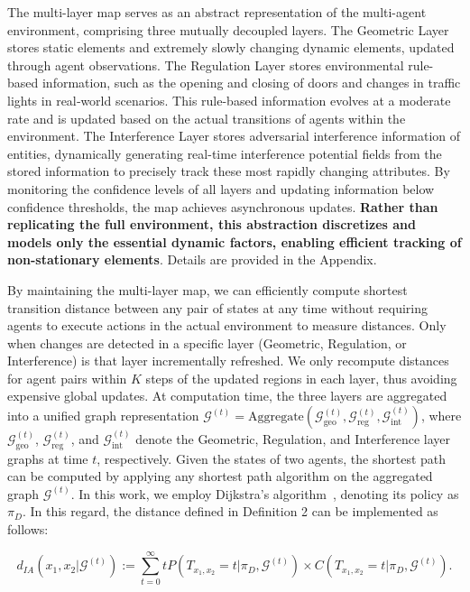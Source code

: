 \documentclass[10pt]{article} %
\newcommand{\rev}[1]{#1}
\begin{document}
The multi-layer map serves as an abstract representation of the multi-agent environment, comprising three mutually decoupled layers. The Geometric Layer stores static elements and extremely slowly changing dynamic elements, updated through agent observations. The Regulation Layer stores environmental rule-based information, such as the opening and closing of doors and changes in traffic lights in real‑world scenarios. This rule-based information evolves at a moderate rate and is updated \rev{based on the actual transitions of agents within the environment}. The Interference Layer stores adversarial interference information of entities, dynamically generating real-time interference potential fields from the stored information to precisely track these most rapidly changing attributes. By monitoring the confidence levels of all layers and updating information below confidence thresholds, the map achieves asynchronous updates. \textbf{Rather than replicating the full environment, this abstraction discretizes and models only the essential dynamic factors, enabling efficient tracking of non-stationary elements}. Details are provided in the Appendix.

By maintaining the multi-layer map, we can efficiently compute shortest transition distance between any pair of states at any time without requiring agents to execute actions in the actual environment to measure distances. Only when changes are detected in a specific layer (Geometric, Regulation, or Interference) \rev{is that layer incrementally refreshed. We only recompute distances for agent pairs within $K$ steps of the updated regions in each layer, thus avoiding expensive global updates}. At computation time, the three layers are aggregated into a unified graph representation $\mathcal{G}^{(t)} = \text{Aggregate}(\mathcal{G}_{\text{geo}}^{(t)}, \mathcal{G}_{\text{reg}}^{(t)}, \mathcal{G}_{\text{int}}^{(t)})$, where $\mathcal{G}_{\text{geo}}^{(t)}$, $\mathcal{G}_{\text{reg}}^{(t)}$, and $\mathcal{G}_{\text{int}}^{(t)}$ denote the Geometric, Regulation, and Interference layer graphs at time $t$, respectively. Given the states of two agents, \rev{the shortest path can be computed by applying any shortest path algorithm on the aggregated graph $\mathcal{G}^{(t)}$. In this work, we employ Dijkstra's algorithm~\citep{dijkstra1959note}}, denoting its policy as \(\pi_D\). In this regard, the distance defined in Definition 2 can be implemented as follows:

\[
d_{IA}(x_1, x_2 | \mathcal{G}^{(t)}) := \sum_{t=0}^{\infty} t P(T_{x_1,x_2}=t|\pi_D, \mathcal{G}^{(t)}) \times C(T_{x_1,x_2}=t|\pi_D, \mathcal{G}^{(t)}).
\]
\end{document}
